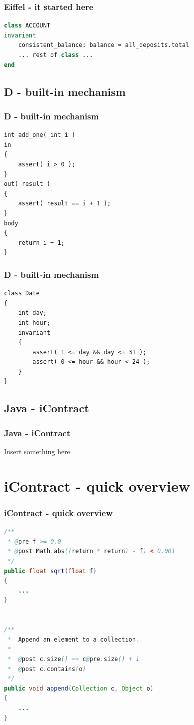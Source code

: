 \documentclass{beamer}
\begin{document}
\begin{frame}[fragile]
\frametitle{Eiffel - it started here}
\begin{lstlisting}[language=Eiffel,caption=http://www.open-std.org/jtc1/sc22/wg21/docs/papers/2004/n1613.pdf]
class ACCOUNT
invariant
    consistent_balance: balance = all_deposits.total
    ... rest of class ...
end
\end{lstlisting}
\end{frame}

\subsection{D - built-in mechanism}
\begin{frame}[fragile]
\frametitle{D - built-in mechanism}
\begin{lstlisting}[caption=http://www.open-std.org/jtc1/sc22/wg21/docs/papers/2004/n1613.pdf]
int add_one( int i )
in
{
    assert( i > 0 );
}
out( result )
{
    assert( result == i + 1 );
}
body
{
    return i + 1;
}
\end{lstlisting}
\end{frame}

\begin{frame}[fragile]
\frametitle{D - built-in mechanism}
\begin{lstlisting}[caption=http://www.open-std.org/jtc1/sc22/wg21/docs/papers/2004/n1613.pdf]
class Date
{
    int day;
    int hour;
    invariant
    {
        assert( 1 <= day && day <= 31 );
        assert( 0 <= hour && hour < 24 );
    }
}
\end{lstlisting}
\end{frame}

\subsection{Java - iContract}
\begin{frame}
\frametitle{Java - iContract}
Insert something here
\end{frame}

\section{iContract - quick overview}
\begin{frame}[fragile]
\frametitle{iContract - quick overview}
\begin{lstlisting}[language=Java]
/** 
 * @pre f >= 0.0
 * @post Math.abs((return * return) - f) < 0.001 
 */ 
public float sqrt(float f)
{
    ...
} 


/**
 *  Append an element to a collection.
 *
 *  @post c.size() == c@pre.size() + 1
 *  @post c.contains(o)
 */
public void append(Collection c, Object o)
{
    ...
}
\end{lstlisting}
\end{frame}
\end{document}
